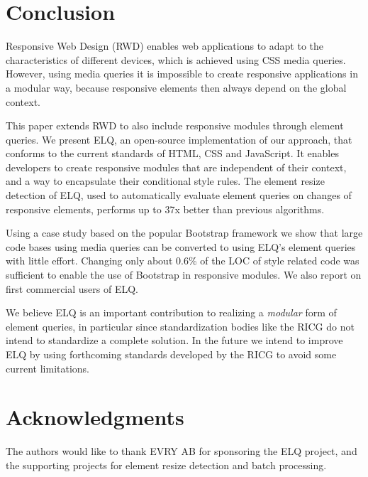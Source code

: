 \documentclass{acm_proc_article-sp}
\newcommand{\elq}{ELQ}
\begin{document}
\section{Conclusion}\label{sec:conclusion}

  Responsive Web Design (RWD) enables web applications to adapt to the characteristics of different devices, which is achieved using CSS media queries.
  However, using media queries it is impossible to create responsive applications in a modular way, because responsive elements then always depend on the global context.

  This paper extends RWD to also include responsive modules through element queries.
  We present \elq{}, an open-source implementation of our approach, that conforms to the current standards of HTML, CSS and JavaScript.
  It enables developers to create responsive modules that are independent of their context, and a way to encapsulate their conditional style rules.
  The element resize detection of \elq{}, used to automatically evaluate element queries on changes of responsive elements, performs up to 37x better than previous algorithms.

  Using a case study based on the popular Bootstrap framework we show that large code bases using media queries can be converted to using \elq{}'s element queries with little effort.
  Changing only about 0.6\% of the LOC of style related code was sufficient to enable the use of Bootstrap in responsive modules.
  We also report on first commercial users of \elq{}.
  
  We believe \elq{} is an important contribution to realizing a \emph{modular} form of element queries, in particular since standardization bodies like the RICG do not intend to standardize a complete solution.
  In the future we intend to improve \elq{} by using forthcoming standards developed by the RICG to avoid some current limitations.


\section{Acknowledgments}
The authors would like to thank EVRY AB for sponsoring the \elq{} project, and the supporting projects for element resize detection and batch processing.

%

%
%
\end{document}
